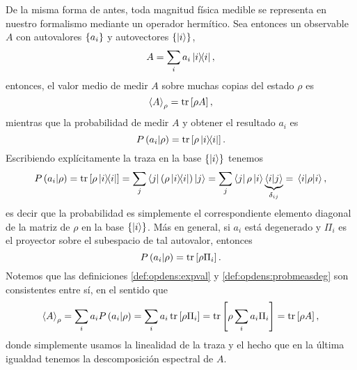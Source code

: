 \documentclass[10pt, a4paper]{article}
\numberwithin{equation}{subsection}
\begin{document}
De la misma forma de antes, toda magnitud física medible se representa en
nuestro formalismo mediante un operador hermítico. Sea entonces un observable
$A$ con autovalores $\set{a_i}$ y autovectores $\set{\ket{i}}$,
\begin{equation}
  A = \sum_i a_i\projector{i},
\end{equation}
entonces, el valor medio de medir $A$ sobre muchas copias del estado $\rho$ es
\begin{equation} \label{def:opdens:expval}
  \expval{A}_{\rho} = \tr\left[\rho A\right],
\end{equation}
mientras que la probabilidad de medir $A$ y obtener el resultado $a_i$ es
\begin{equation} \label{def:opdens:probmeas}
  \ProbCond{a_i}{\rho} = \tr\left[\rho\projector{i}\right].
\end{equation}
Escribiendo explícitamente la traza en la base $\set{\ket{i}}$ tenemos
\begin{equation} \label{def:opdens:probmeasdiagel}
  \ProbCond{a_i}{\rho} = \tr\left[\rho\projector{i}\right]
  = \sum_j \bra{j}\left(\rho\projector{i}\right)\ket{j}
  = \sum_j \bra{j}\rho\ket{i}\underbrace{\braket{i}{j}}_{\delta_{ij}}
  = \matrixel{i}{\rho}{i},
\end{equation}
es decir que la probabilidad es simplemente el correspondiente elemento
diagonal de la matriz de $\rho$ en la base $\set{\ket{i}}$.
Más en general, si $a_i$ está degenerado y $\Pi_i$ es el proyector sobre el
subespacio de tal autovalor, entonces
\begin{equation} \label{def:opdens:probmeasdeg}
  P\left({a_i}\middle|{\rho}\right) = \tr\left[\rho\Pi_{i}\right].
\end{equation}
Notemos que las definiciones \eqref{def:opdens:expval} y
\eqref{def:opdens:probmeasdeg} son consistentes entre sí, en el sentido que
\begin{equation}
  \expval{A}_{\rho} = \sum_i a_iP\left({a_i}\middle|{\rho}\right) = \sum_i a_i
  \tr\left[\rho\Pi_{i}\right] = \tr\left[\rho \sum_i a_i\Pi_i\right] =
  \tr\left[\rho A\right],
\end{equation}
donde simplemente usamos la linealidad de la traza y el hecho que en la última
igualdad tenemos la descomposición espectral de $A$.
\end{document}
